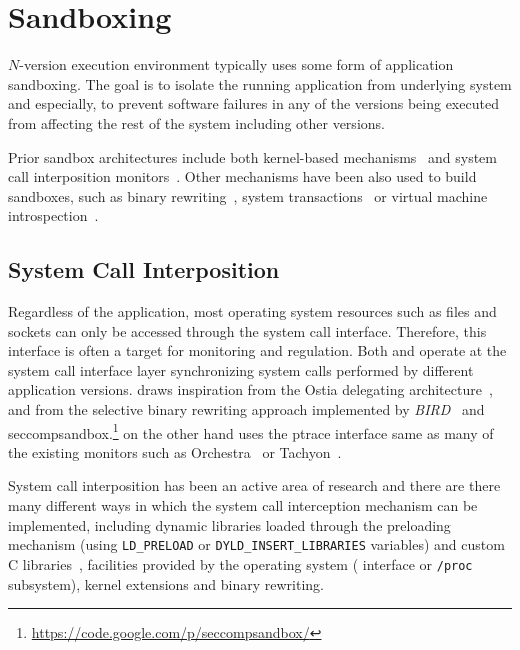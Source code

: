 \section{Sandboxing}
\label{related:sandboxing}

$N$-version execution environment typically uses some form of application
sandboxing. The goal is to isolate the running application from underlying
system and especially, to prevent software failures in any of the versions
being executed from affecting the rest of the system including other versions.

Prior sandbox architectures include both kernel-based
mechanisms~\cite{tron,remus,subdomain,cots-hardening} and system call
interposition monitors~\cite{wily-hacker,mapbox,jain1999,provos2002,mbox}.
Other mechanisms have been also used to build sandboxes, such as binary
rewriting~\cite{vx32,true:sp12}, system transactions~\cite{txbox} or virtual
machine introspection~\cite{garfinkel:vmi}.

\subsection{System Call Interposition}
\label{related:syscalls}

Regardless of the application, most operating system resources such as files
and sockets can only be accessed through the system call interface.  Therefore,
this interface is often a target for monitoring and regulation. Both \varan and
\mx operate at the system call interface layer synchronizing system calls
performed by different application versions. \varan draws inspiration from the
Ostia delegating architecture~\cite{ostia}, and from the selective binary
rewriting approach implemented by \emph{BIRD}~\cite{bird} and
\textsf{seccompsandbox}.\footnote{\url{https://code.google.com/p/seccompsandbox/}}
\mx on the other hand uses the \textsf{ptrace} interface same as many of the
existing monitors such as Orchestra~\cite{orchestra09} or
Tachyon~\cite{tachyon12}.

System call interposition has been an active area of research and there are
there many different ways in which the system call interception mechanism can
be implemented, including dynamic libraries loaded through the preloading
mechanism (\ie using \lstinline`LD_PRELOAD` or
\lstinline`DYLD_INSERT_LIBRARIES` variables) and custom C
libraries~\cite{plash}, facilities provided by the operating system (\ie
\ptrace interface or \lstinline`/proc` subsystem), kernel extensions and binary
rewriting.

